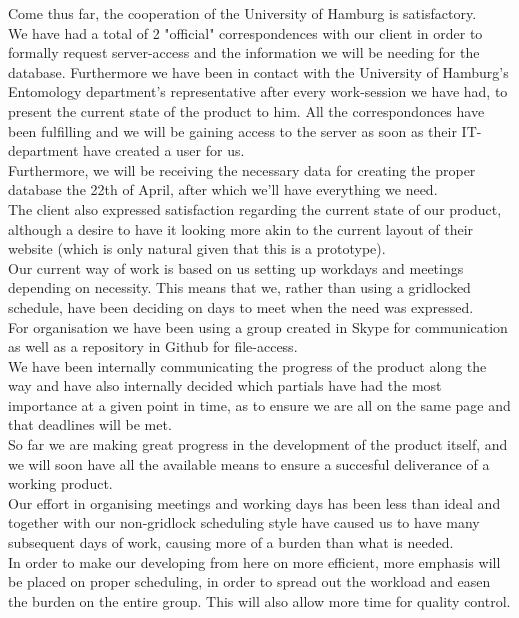 \documentclass[12pt,a4paper]{article}
\begin{document}
Come thus far, the cooperation of the University of Hamburg is satisfactory.\\
We have had a total of 2 "official" correspondences with our client in order to formally request server-access and the information we will be needing for the database. Furthermore we have been in contact with the University of Hamburg's Entomology department's representative after every work-session we have had, to present the current state of the product to him.
All the correspondonces have been fulfilling and we will be gaining access to the server as soon as their IT-department have created a user for us.\\ Furthermore, we will be receiving the necessary data for creating the proper database the 22th of April, after which we'll have everything we need. \\
The client also expressed satisfaction regarding the current state of our product, although a desire to have it looking more akin to the current layout of their website (which is only natural given that this is a prototype).\\
Our current way of work is based on us setting up workdays and meetings depending on necessity. This means that we, rather than using a gridlocked schedule, have been deciding on days to meet when the need was expressed.\\
For organisation we have been using a group created in Skype for communication as well as a repository in Github for file-access. \\
We have been internally communicating the progress of the product along the way and have also internally decided which partials have had the most importance at a given point in time, as to ensure we are all on the same page and that deadlines will be met.\\

So far we are making great progress in the development of the product itself, and we will soon have all the available means to ensure a succesful deliverance of a working product.\\
Our effort in organising meetings and working days has been less than ideal and together with our non-gridlock scheduling style have caused us to have many subsequent days of work, causing more of a burden than what is needed.\\
In order to make our developing from here on more efficient, more emphasis will be placed on proper scheduling, in order to spread out the workload and easen the burden on the entire group. This will also allow more time for quality control.
\end{document}
